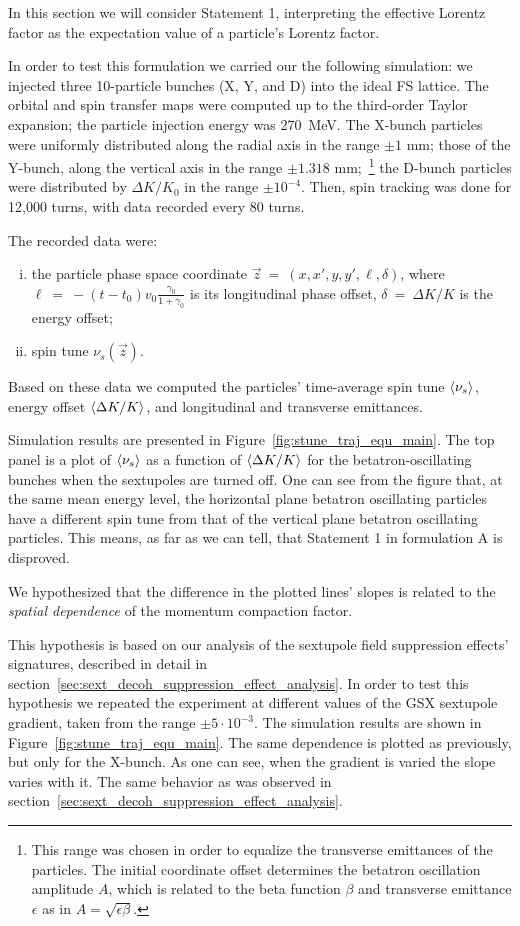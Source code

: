 
In this section we will consider Statement 1, interpreting the effective Lorentz factor as the expectation value
of a particle's Lorentz factor.

In order to test this formulation we carried our the following simulation: we injected three 10-particle
bunches (X, Y, and D) into the ideal FS lattice. The orbital and spin transfer maps were computed
up to the third-order Taylor expansion; the particle injection energy was 270~MeV. The X-bunch particles
were uniformly distributed along the radial axis in the range $\pm 1$ mm; those of the Y-bunch, along the vertical
axis in the range $\pm 1.318$ mm;~\footnote{This range was chosen in order to equalize the transverse
emittances of the particles. The initial coordinate offset determines the betatron oscillation amplitude $A$,
which is related to the beta function $\beta$ and transverse emittance $\epsilon$ as in
$A = \sqrt{\epsilon \beta}$.} the D-bunch particles were distributed by $\Delta K/K_0$ in the range $\pm 10^{-4}$.
Then, spin tracking was done for 12,000 turns, with data recorded every 80 turns.

The recorded data were: 
\begin{enumerate}[(i)]
	\item the particle phase space coordinate $\vec z~=~(x,x',y,y',\ell, \delta)$, where
$\ell~=~-(t-t_0)v_0\frac{\gamma_0}{1+\gamma_0}$ is its longitudinal phase offset, 
$\delta~=~\Delta K/K$ is the energy offset;
\item spin tune $\nu_s(\vec z)$.
\end{enumerate}
Based on these data we computed the particles' time-average spin tune $\avg{\nu_s}$,
energy offset  $\avg{\Delta K/K}$, and longitudinal and transverse emittances.

Simulation results are presented in Figure~\ref{fig:stune_traj_equ_main}. The top panel is a plot of $\avg{\nu_s}$ as a function of $\avg{\Delta K/K}$ for the betatron-oscillating bunches when the sextupoles
are turned off. One can see from the figure that, at the same mean energy level, the horizontal plane
 betatron oscillating particles have a different spin tune from that of the vertical plane betatron
oscillating particles. This means, as far as we can tell, that Statement 1 in formulation A is disproved.

We hypothesized that the difference in the plotted lines' slopes is related to the
\emph{spatial dependence} of the momentum compaction factor.

This hypothesis is based on our analysis of the sextupole field suppression effects' signatures, described
in detail in section~\ref{sec:sext_decoh_suppression_effect_analysis}. In order to test this hypothesis we
repeated the experiment at different values of the GSX sextupole gradient, taken from
the range $\pm 5\cdot 10^{-3}$. The simulation results are shown in Figure~\ref{fig:stune_traj_equ_main}.
The same dependence is plotted as previously, but only for the X-bunch.
As one can see, when the gradient is varied the slope varies with it. The same behavior as was
observed in section~\ref{sec:sext_decoh_suppression_effect_analysis}.

